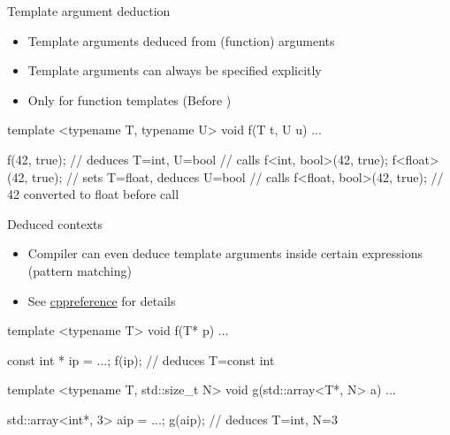 \begin{advanced}

\begin{frame}[fragile]
  \begin{block}{Template argument deduction}
    \begin{itemize}
    \item Template arguments deduced from (function) arguments
    \item Template arguments can always be specified explicitly
    \item Only for function templates (Before )
    \end{itemize}
  \end{block}
  \begin{cppcode*}{}
    template <typename T, typename U>
    void f(T t, U u) { ... }

    f(42, true);        // deduces T=int, U=bool
                        // calls f<int, bool>(42, true);
    f<float>(42, true); // sets T=float, deduces U=bool
                        // calls f<float, bool>(42, true);
                        // 42 converted to float before call
  \end{cppcode*}
\end{frame}

\begin{frame}[fragile]
  \begin{block}{Deduced contexts}
    \begin{itemize}
    \item Compiler can even deduce template arguments inside certain expressions (pattern matching)
    \item See \href{https://en.cppreference.com/w/cpp/language/template_argument_deduction}{cppreference} for details
    \end{itemize}
  \end{block}
  \begin{cppcode*}{}
    template <typename T>
    void f(T* p) { ... }

    const int * ip = ...;
    f(ip); // deduces T=const int

    template <typename T, std::size_t N>
    void g(std::array<T*, N> a) { ... }

    std::array<int*, 3> aip = ...;
    g(aip); // deduces T=int, N=3
  \end{cppcode*}
\end{frame}


\end{advanced}
